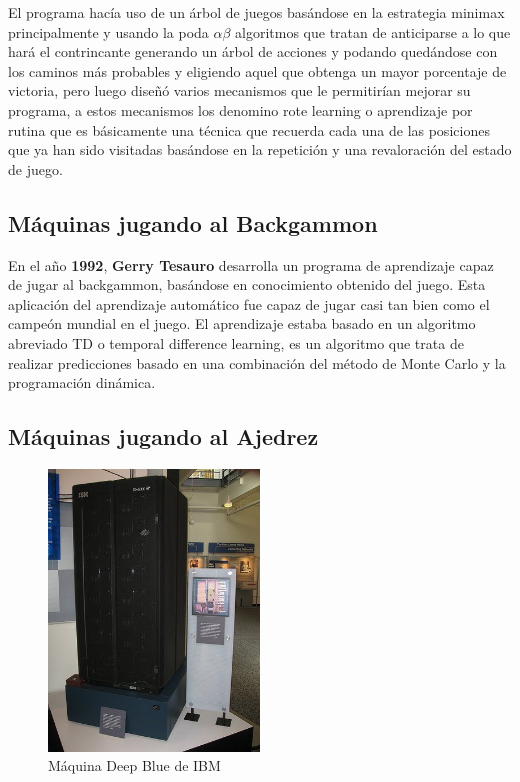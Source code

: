\documentclass[a4paper, 11pt]{article} %
\begin{document}
El programa hacía uso de un árbol de juegos basándose en la estrategia minimax principalmente y usando la poda $\alpha\beta$ algoritmos que tratan de anticiparse a lo que hará el contrincante generando un árbol de acciones y podando quedándose con los caminos más probables y eligiendo aquel que obtenga un mayor porcentaje de victoria, pero luego diseñó varios mecanismos que le permitirían mejorar su programa, a estos mecanismos los denomino rote learning o aprendizaje por rutina que es básicamente una técnica que recuerda cada una de las posiciones que ya han sido visitadas basándose en la repetición y una revaloración del estado de juego.

\subsection{Máquinas jugando al Backgammon}
En el año \textbf{1992}, \textbf{Gerry Tesauro} desarrolla un programa de aprendizaje capaz de jugar al backgammon, basándose en conocimiento obtenido del juego. Esta aplicación del aprendizaje automático fue capaz de jugar casi tan bien como el campeón mundial en el juego. El aprendizaje estaba basado en un algoritmo abreviado TD o temporal difference learning, es un algoritmo que trata de realizar predicciones basado en una combinación del método de Monte Carlo y la programación dinámica.

\subsection{Máquinas jugando al Ajedrez}

\begin{figure}[H]
\centering
\includegraphics[width=0.5\textwidth]{deepblue}
\caption{Máquina Deep Blue de IBM}
\label{Ejemplo kNN}
\end{figure}
\end{document}
